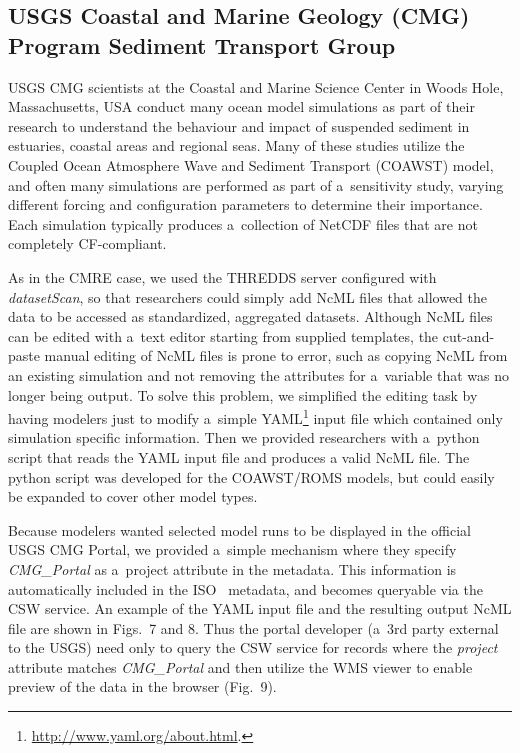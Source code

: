 \documentclass[osd, online, hvmath]{copernicus}
\begin{document}
\subsection{USGS Coastal and Marine Geology (CMG) Program Sediment Transport
  Group}

USGS CMG scientists at the Coastal and
Marine Science Center in Woods Hole, Massachusetts, USA conduct many ocean model
simulations as part of their research to understand the behaviour and
impact of suspended sediment in estuaries, coastal areas and regional
seas. Many of these studies utilize the Coupled Ocean Atmosphere Wave
and Sediment Transport (COAWST) model, and often many simulations are
performed as part of a~sensitivity study, varying different forcing
and configuration parameters to determine their importance. Each
simulation typically produces a~collection of NetCDF files that are
not completely CF-compliant.

As in the CMRE case, we used the THREDDS server configured with
\textit{datasetScan}, so that researchers could simply add NcML files
that allowed the data to be accessed as standardized, aggregated
datasets. Although NcML files can be edited with a~text editor
starting from supplied templates, the cut-and-paste manual editing of
NcML files is prone to error, such as copying NcML from an existing
simulation and not removing the attributes for a~variable that
was no longer being output. To solve this problem, we simplified the
editing task by having modelers just to modify a~simple YAML\footnote{\url{http://www.yaml.org/about.html}.} input file which contained only simulation
specific information. Then we provided researchers with a~python
script that reads the YAML input file and produces a valid NcML file. The python script
was developed for the COAWST/ROMS models, but could easily be expanded
to cover other model types.

Because modelers wanted selected model runs to be displayed in the
official USGS CMG Portal, we provided a~simple mechanism where they
specify \textit{CMG\_Portal} as a~project attribute in the
metadata. This information is automatically included in the ISO~
metadata, and becomes queryable via the CSW service. An example of the
YAML input file and the resulting output NcML file are shown in
Figs.~7 and 8. Thus the portal developer (a~3rd party external to the
USGS) need only to query the CSW service for records where the
\textit{project} attribute matches \textit{CMG\_Portal} and then
utilize the WMS 
viewer to enable preview of the data in the browser
(Fig.~9).
\end{document}
